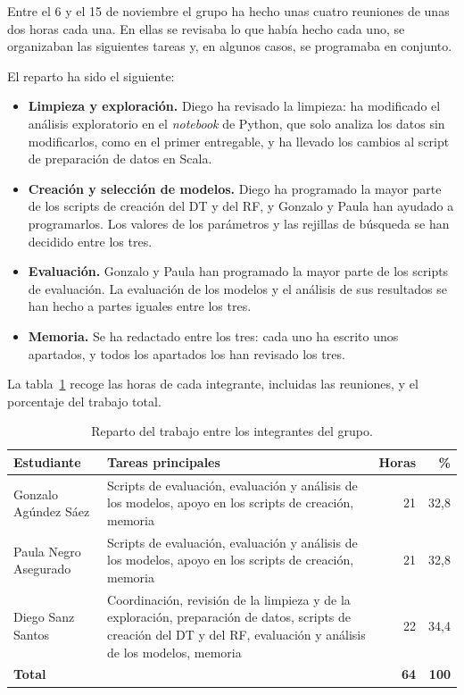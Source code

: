 \documentclass[12pt,a4paper]{article}
\begin{document}
Entre el 6 y el 15 de noviembre el grupo ha hecho unas cuatro reuniones de
unas dos horas cada una. En ellas se revisaba lo que había hecho cada uno,
se organizaban las siguientes tareas y, en algunos casos, se programaba
en conjunto.

El reparto ha sido el siguiente:
\begin{itemize}
    \item \textbf{Limpieza y exploración.} Diego ha revisado la limpieza:
    ha modificado el análisis exploratorio en el \textit{notebook} de
    Python, que solo analiza los datos sin modificarlos, como en el primer
    entregable, y ha llevado los cambios al script de preparación de datos
    en Scala.
    \item \textbf{Creación y selección de modelos.} Diego ha programado la
    mayor parte de los scripts de creación del \ac{DT} y del \ac{RF}, y
    Gonzalo y Paula han ayudado a programarlos. Los valores de los
    parámetros y las rejillas de búsqueda se han decidido entre los tres.
    \item \textbf{Evaluación.} Gonzalo y Paula han programado la mayor
    parte de los scripts de evaluación. La evaluación de los modelos y el
    análisis de sus resultados se han hecho a partes iguales entre los
    tres.
    \item \textbf{Memoria.} Se ha redactado entre los tres: cada uno ha
    escrito unos apartados, y todos los apartados los han revisado los
    tres.
\end{itemize}

La tabla~\ref{tab:reparto} recoge las horas de cada integrante, incluidas
las reuniones, y el porcentaje del trabajo total.

\begin{table}[H]
\centering
\small
\begin{tabular}{>{\raggedright\arraybackslash}p{3.8cm} >{\raggedright\arraybackslash}p{7.2cm} r r}
\toprule
\textbf{Estudiante} & \textbf{Tareas principales} & \textbf{Horas} & \textbf{\%} \\
\midrule
Gonzalo Agúndez Sáez & Scripts de evaluación, evaluación y análisis de los modelos, apoyo en los scripts de creación, memoria & 21 & 32,8 \\
Paula Negro Asegurado & Scripts de evaluación, evaluación y análisis de los modelos, apoyo en los scripts de creación, memoria & 21 & 32,8 \\
Diego Sanz Santos & Coordinación, revisión de la limpieza y de la exploración, preparación de datos, scripts de creación del \acs{DT} y del \acs{RF}, evaluación y análisis de los modelos, memoria & 22 & 34,4 \\
\midrule
\textbf{Total} & & \textbf{64} & \textbf{100} \\
\bottomrule
\end{tabular}
\caption{Reparto del trabajo entre los integrantes del grupo.}
\label{tab:reparto}
\end{table}
\end{document}
